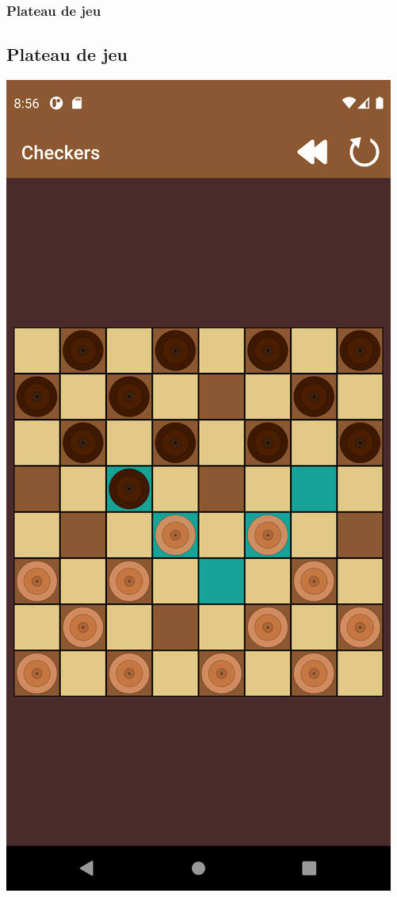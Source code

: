 \documentclass{beamer}
\begin{document}
\begin{frame}
  \frametitle{Plateau de jeu}
  \subsection{Plateau de jeu}
  \begin{center}
    \includegraphics[scale=0.05]{partie_1.png}

\end{center}
\end{frame}
\end{document}
